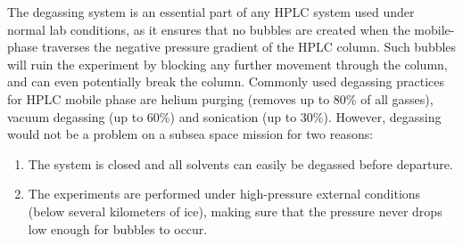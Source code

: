 The degassing system is an essential part of any HPLC system used under normal lab conditions, as it ensures that no bubbles are created when the mobile-phase traverses the negative pressure gradient of the HPLC column. Such bubbles will ruin the experiment by blocking any further movement through the column, and can even potentially break the column.  Commonly used degassing practices for HPLC mobile phase are helium purging (removes up to 80\% of all gasses), vacuum degassing (up to 60\%) and sonication (up to 30\%). However, degassing would not be a problem on a subsea space mission for two reasons: 
\begin{enumerate}
    \item The system is closed and all solvents can easily be degassed before departure.
    \item The experiments are performed under high-pressure external conditions (below several kilometers of ice), making sure that the pressure never drops low enough for bubbles to occur.
\end{enumerate}

